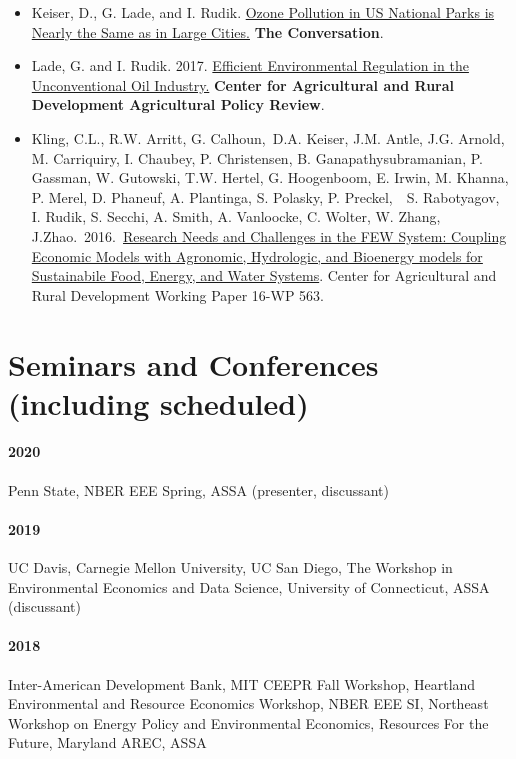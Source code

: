 \documentclass{res} %
\begin{document}
\begin{resume}
\begin{itemize} %
	\item[] Keiser, D., G. Lade, and I. Rudik. \href{https://theconversation.com/ozone-pollution-in-us-national-parks-is-nearly-the-same-as-in-large-cities-100148}{Ozone Pollution in US National Parks is Nearly the Same as in Large Cities.} \textbf{The Conversation}.
	\item[] Lade, G. and I. Rudik. 2017. \href{https://www.card.iastate.edu/ag_policy_review/display.aspx?id=70}{Efficient Environmental Regulation in the Unconventional Oil Industry.} \textbf{Center for Agricultural and Rural Development Agricultural Policy Review}.
	\item[] Kling, C.L., R.W. Arritt, G. Calhoun, D.A. Keiser, J.M. Antle, J.G. Arnold, M. Carriquiry, I. Chaubey, P. Christensen, B. Ganapathysubramanian, P. Gassman, W. Gutowski, T.W. Hertel, G. Hoogenboom, E. Irwin, M. Khanna, P. Merel, D. Phaneuf, A. Plantinga, S. Polasky, P. Preckel,  S. Rabotyagov, I. Rudik, S. Secchi, A. Smith, A. Vanloocke, C. Wolter, W. Zhang, J.Zhao. 2016. \href{http://www.card.iastate.edu/products/publications/pdf/16wp563.pdf}{Research Needs and Challenges in the FEW System: Coupling Economic Models with Agronomic, Hydrologic, and Bioenergy models for Sustainabile Food, Energy, and Water Systems}. Center for Agricultural and Rural Development Working Paper 16-WP 563.
\end{itemize}
\vspace{-.075in}
\section{Seminars and Conferences (including scheduled)}\vspace{-.1in}
\paragraph{2020} Penn State, NBER EEE Spring, ASSA (presenter, discussant) \vspace{-.3in}
\paragraph{2019} UC Davis, Carnegie Mellon University, UC San Diego, The Workshop in Environmental Economics and Data Science, University of Connecticut, ASSA (discussant) \vspace{-.3in}
\paragraph{2018} Inter-American Development Bank, MIT CEEPR Fall Workshop, Heartland Environmental and Resource Economics Workshop, NBER EEE SI, Northeast Workshop on Energy Policy and Environmental Economics, Resources For the Future, Maryland AREC, ASSA \vspace{-.3in}

\end{resume}
\end{document}
